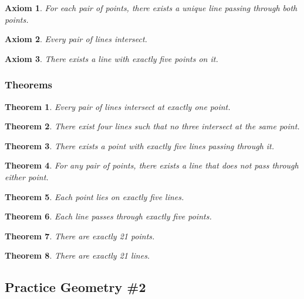 \documentclass[11pt]{article}
\theoremstyle{definition}
\theoremstyle{plain}
\newtheorem{axiom}{Axiom}[subsection]
\newtheorem{theorem}{Theorem}[subsection]
\begin{document}
\begin{axiom}
For each pair of points, there exists a unique line passing through both points.
\end{axiom}

\begin{axiom}
Every pair of lines intersect.
\end{axiom}

\begin{axiom}
There exists a line with exactly five points on it.
\end{axiom}

\subsubsection*{Theorems}

\begin{theorem}
Every pair of lines intersect at exactly one point.
\end{theorem}

\begin{theorem}
There exist four lines such that no three intersect at the same point.
\end{theorem}

\begin{theorem}
There exists a point with exactly five lines passing through it.
\end{theorem}

\begin{theorem}
For any pair of points, there exists a line that does not pass through either point.
\end{theorem}

\begin{theorem}
Each point lies on exactly five lines.
\end{theorem}

\begin{theorem}
Each line passes through exactly five points.
\end{theorem}

\begin{theorem}
There are exactly 21 points.
\end{theorem}

\begin{theorem}
There are exactly 21 lines.
\end{theorem}

\subsection{Practice Geometry \#2}
\end{document}
